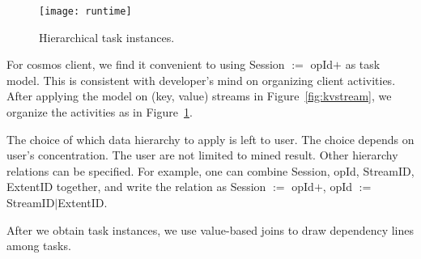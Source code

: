 \begin{figure}
\centering
\texttt{[image: runtime]}
\caption{Hierarchical task instances.}
\label{fig:runtime}
\end{figure}

For cosmos client, we find it convenient to using Session
$:=$ opId$+$ as task model. This is consistent with
developer's mind on organizing client activities. After
applying the model on (key, value) streams in
Figure~\ref{fig:kvstream}, we organize the activities as in
Figure~\ref{fig:runtime}.

The choice of which data hierarchy to apply is left to user.
The choice depends on user's concentration. The user are not
limited to mined result. Other hierarchy relations can be
specified. For example, one can combine Session, opId,
StreamID, ExtentID together, and write the relation as
Session $:=$ opId$+$, opId $:=$ StreamID$|$ExtentID.

After we obtain task instances, we use value-based joins to
draw dependency lines among tasks.

